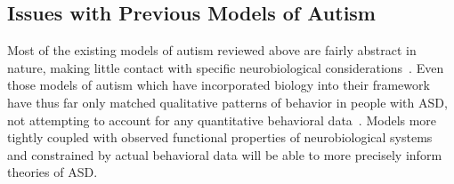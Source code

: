 \documentclass[man]{apa}
\begin{document}


\subsection{Issues with Previous Models of Autism}
Most of the existing models of autism reviewed above are fairly abstract in nature, making little contact with specific neurobiological considerations~\cite{CohenIL:1994:AutismLearning,McClellandJL:2000:Autism,OLoughlinC:2000:Coherence}.  Even those models of autism which have incorporated biology into their framework have thus far only matched qualitative patterns of behavior in people with ASD, not attempting to account for any quantitative behavioral data~\cite{GustafssonL:1997:AutismMaps,RefWorks:146}.  Models more tightly coupled with observed functional properties of neurobiological systems and constrained by actual behavioral data will be able to more precisely inform theories of ASD. 
\end{document}
